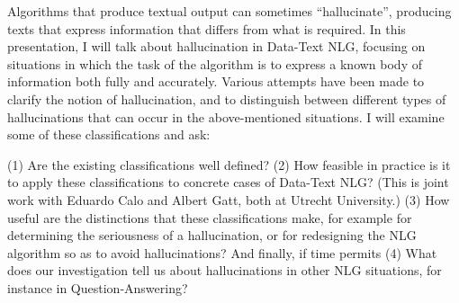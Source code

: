 Algorithms that produce textual output can sometimes ``hallucinate'', producing texts that express information that differs from what is required. 
In this presentation, I will talk about hallucination in Data-Text NLG, focusing on situations in which the task of the algorithm is to express a known body of information both fully and accurately. 
Various attempts have been made to clarify the notion of hallucination, and to distinguish between different types of hallucinations that can occur in the above-mentioned situations. 
I will examine some of these classifications and ask: 

(1) Are the existing classifications well defined? 
(2) How feasible in practice is it to apply these classifications to concrete cases of Data-Text NLG? (This is joint work with Eduardo Calo and Albert Gatt, both at Utrecht University.) 
(3) How useful are the distinctions that these classifications make, for example for determining the seriousness of a hallucination, or for redesigning the NLG algorithm so as to avoid hallucinations? 
And finally, if time permits (4) What does our investigation tell us about hallucinations in other NLG situations, for instance in Question-Answering? 
